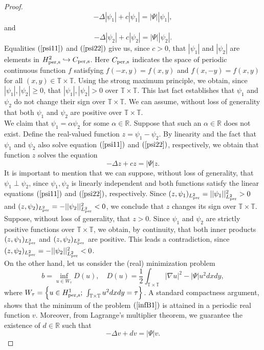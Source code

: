 \documentclass[12pt,reqno,a4paper]{amsart} %
\numberwithin{equation}{section}
\numberwithin{figure}{section}
\begin{document}
\begin{proof}
\begin{equation}\label{psi11}
-\Delta |\psi_1|+c|\psi_1|=|\Psi||\psi_1|,
\end{equation}
and
\begin{equation}\label{psi22}
-\Delta |\psi_2|+c|\psi_2|=|\Psi||\psi_2|.
\end{equation}
Equalities $(\ref{psi11})$ and $(\ref{psi22})$ give us, since $c>0$, that $|\psi_1|$ and $|\psi_2|$ are elements in $H_{\rm per,s}^2\hookrightarrow C_{\rm per,s}$. Here $C_{\rm per,s}$ indicates the space of periodic continuous function $f$ satisfying $f(-x,y)=f(x,y)$ and $f(x,-y)=f(x,y)$ for all $(x,y)\in\mathbb{T}\times\mathbb{T}$. Using the strong maximum principle, we obtain, since $|\psi_1|,|\psi_2|\geq0$, that $|\psi_1|,|\psi_2|>0$ over $\mathbb{T}\times\mathbb{T}$. This last fact establishes that $\psi_1$ and $\psi_2$ do not change their sign over $\mathbb{T}\times\mathbb{T}$. We can assume, without loss of generality that both $\psi_1$ and $\psi_2$ are positive over $\mathbb{T}\times\mathbb{T}$.\\
\indent We claim that $\psi_1=\alpha\psi_2$ for some $\alpha\in\mathbb{R}$. Suppose that such an $\alpha\in\mathbb{R}$ does not exist. Define the real-valued function $z=\psi_1-\psi_2$. By linearity and the fact that $\psi_1$ and $\psi_2$ also solve equation $(\ref{psi11})$ and $(\ref{psi22})$, respectively, we obtain that function $z$ solves the equation
\begin{equation}\label{z}
-\Delta z+cz=|\Psi|z.
\end{equation}
It is important to mention that we can suppose, without loss of generality, that $\psi_1 \perp \psi_2$, since ${\psi_1, \psi_2}$ is linearly independent and both functions satisfy the linear equations $(\ref{psi11})$ and $(\ref{psi22})$, respectively. Since $(z, \psi_1)_{L_{\rm per}^2} = ||\psi_1||_{L_{\rm per}^2}^2 > 0$ and $(z, \psi_2)_{L_{\rm per}^2} = -||\psi_2||_{L_{\rm per}^2}^2 < 0$, we conclude that $z$ changes its sign over $\mathbb{T} \times \mathbb{T}$. Suppose, without loss of generality, that $z>0$. Since $\psi_1$ and $\psi_2$ are strictly positive functions over $\mathbb{T}\times\mathbb{T}$, we obtain, by continuity, that both inner products $(z,\psi_1)_{L_{\rm per}^2}$ and $(z,\psi_2)_{L_{\rm per}^2}$ are positive. This leads a contradiction, since $(z, \psi_2)_{L_{\rm per}^2} = -||\psi_2||_{L_{\rm per}^2}^2<0$. \\
\indent On the other hand, let us consider the (real)  minimization problem
\begin{equation}
				\label{infB1}
				b = \inf_{u\in W_\tau} D(u), \quad
				D(u) = \frac{1}{2}\int_{\mathbb{T}\times\mathbb{T}}|\nabla u|^2-|\Psi|u^2 dxdy,
			\end{equation}
			where $W_{\tau}=\left\{u\in H_{\rm per,s}^1;\ \int_{\mathbb{T}\times\mathbb{T}} u^2 dxdy = \tau \right\}$. A standard compactness argument, shows that the minimum of the problem $(\ref{infB1})$ is attained in a periodic real function $v$. Moreover, from Lagrange's multiplier theorem, we guarantee the existence of $d\in\mathbb{R}$ such that
\begin{equation}\label{lambda}
-\Delta v+dv=|\Psi|v.
\end{equation}


\end{proof}
\end{document}
